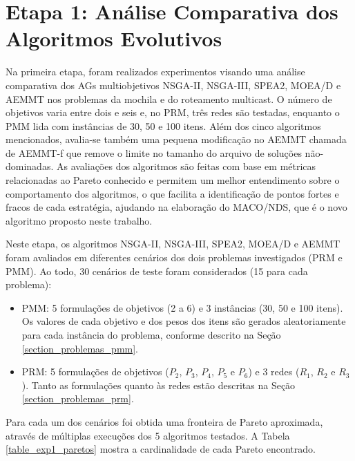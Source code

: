 \section{Etapa 1: Análise Comparativa dos Algoritmos Evolutivos}
\label{section_experimentos_etapa1}

Na primeira etapa, foram realizados experimentos visando uma análise comparativa dos AGs multiobjetivos NSGA-II, NSGA-III, SPEA2, MOEA/D e AEMMT nos problemas da mochila e do roteamento multicast. O número de objetivos varia entre dois e seis e, no PRM, três redes são testadas, enquanto o PMM lida com instâncias de 30, 50 e 100 itens. Além dos cinco algoritmos mencionados, avalia-se também uma pequena modificação no AEMMT chamada de AEMMT-f que remove o limite no tamanho do arquivo de soluções não-dominadas. As avaliações dos algoritmos são feitas com base em métricas relacionadas ao Pareto conhecido e permitem um melhor entendimento sobre o comportamento dos algoritmos, o que facilita a identificação de pontos fortes e fracos de cada estratégia, ajudando na elaboração do MACO/NDS, que é o novo algoritmo proposto neste trabalho.

Neste etapa, os algoritmos NSGA-II, NSGA-III, SPEA2, MOEA/D e AEMMT foram avaliados em diferentes cenários dos dois problemas investigados (PRM e PMM). Ao todo, 30 cenários de teste foram considerados (15 para cada problema):

\begin{itemize}
	\item PMM: 5 formulações de objetivos (2 a 6) e 3 instâncias (30, 50 e 100 itens). Os valores de cada objetivo e dos pesos dos itens são gerados aleatoriamente para cada instância do problema, conforme descrito na Seção \ref{section_problemas_pmm}.
	\item PRM: 5 formulações de objetivos ($P_2$, $P_3$, $P_4$, $P_5$ e $P_6$) e 3 redes ($R_1$, $R_2$ e $R_3$). Tanto as formulações quanto às redes estão descritas na Seção \ref{section_problemas_prm}.
\end{itemize}

Para cada um dos cenários foi obtida uma fronteira de Pareto aproximada, através de múltiplas execuções dos 5 algoritmos testados. A Tabela \ref{table_exp1_paretos} mostra a cardinalidade de cada Pareto encontrado.

